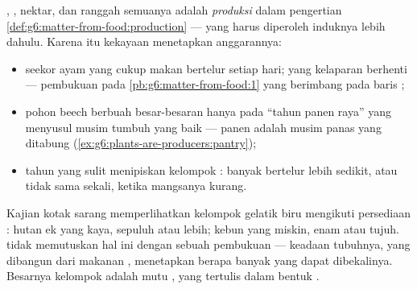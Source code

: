 \begin{proposition}\label{prop:g8:reproduction-and-environment:cost}
, , nektar,  dan ranggah semuanya adalah \emph{produksi}
dalam pengertian
\cref{def:g6:matter-from-food:production} ---  yang
harus diperoleh induknya lebih dahulu. Karena itu kekayaan 
menetapkan anggarannya:
\begin{itemize}
  \item seekor ayam yang cukup makan bertelur setiap hari; yang
        kelaparan berhenti --- pembukuan pada
        \cref{pb:g6:matter-from-food:1} yang berimbang pada baris
        ;
  \item pohon beech berbuah besar-besaran hanya pada ``tahun panen
        raya'' yang menyusul musim tumbuh yang baik --- panen 
        adalah musim panas yang ditabung
        (\cref{ex:g6:plants-are-producers:pantry});
  \item tahun yang sulit menipiskan kelompok : banyak 
        bertelur lebih sedikit, atau tidak sama sekali, ketika
        mangsanya kurang.
\end{itemize}
\end{proposition}
\admitted

\begin{example}\label{ex:g8:reproduction-and-environment:clutch}
Kajian kotak sarang memperlihatkan kelompok  gelatik biru
mengikuti persediaan : hutan ek yang kaya, sepuluh  atau
lebih; kebun yang miskin, enam atau tujuh.  tidak memutuskan
hal ini dengan sebuah pembukuan --- keadaan tubuhnya, yang dibangun
dari makanan , menetapkan berapa banyak yang dapat
dibekalinya. Besarnya kelompok  adalah mutu , yang
tertulis dalam bentuk .
\end{example}

